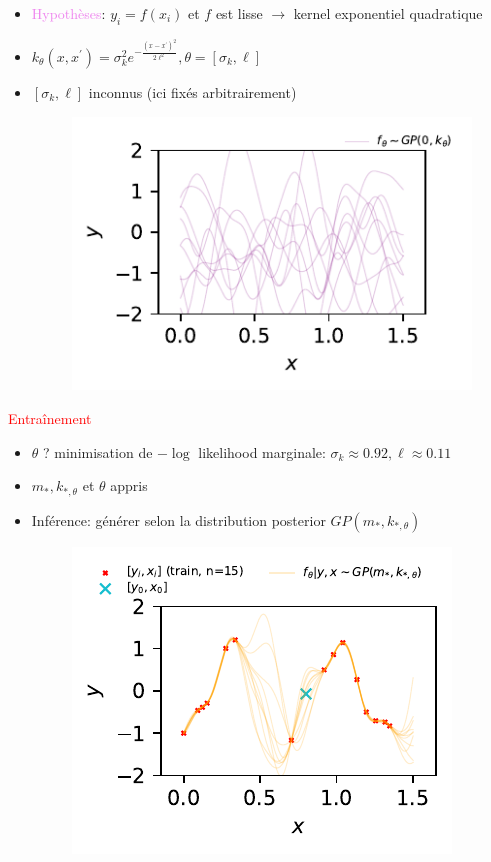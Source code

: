 \documentclass[xcolor=svgnames, t]{beamer}
\newcommand{\tored}[1]{\textcolor{red}{#1}}
\newcommand{\toblue}[1]{\textcolor{internationalblue}{#1}}
\newcommand{\topurple}[1]{\textcolor{violet}{#1}}
\begin{document}
\begin{frame}{\subsecname}
  \begin{itemize}
    \item<1-> \topurple{Hypothèses}: $y_i = f(x_i)$ et $f$ est lisse $\rightarrow$ kernel exponentiel quadratique
    \item $k_\theta (x, x^\prime) = \sigma_k^2 e^{- \frac{(x - x^\prime)^2}{2 \ell^2} }, \theta = [\sigma_k, \ell]$
    \item<2-> $[\sigma_k, \ell]$ inconnus (ici fixés arbitrairement)
      \begin{figure}
        \includegraphics{gp_1D_example_noisefree_data_prior.pdf}
      \end{figure}    
  \end{itemize}
\end{frame}

\begin{frame}{\subsecname}
  \tored{Entraînement}
  \begin{itemize}
    \item<1-> $\theta$ ? minimisation de $-\log$ likelihood marginale: $\sigma_k \approx 0.92, \ell \approx 0.11$
    \item<2-> $m_{*}, k_{*, \theta}$ et $\theta$ appris
    \item<3-> \toblue{Inférence}: générer selon la distribution posterior $GP( m_{*}, k_{*, \theta} )$
      \begin{figure}
        \includegraphics{gp_1D_example_noisefree_pred.pdf}
      \end{figure}
  \end{itemize}
\end{frame}
\end{document}
